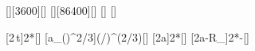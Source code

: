 [\hour][3600][\s]
[\day][86400][\s]
[\m]
[\m]

[2\,t]{2*\tFX}[\s]
[a_\left(\right)^{2/3}]{\aMoX*(\THeX/\TMoX)^(2/3)}[\m]
[2a]{2*\aHeX}[\m]
[2a-R_]{2*\aHeX-\RErdX}[\m]
